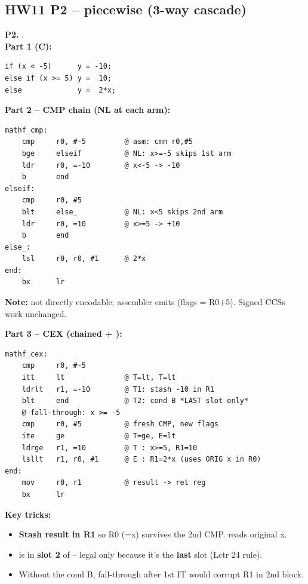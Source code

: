 \subsection{HW11 P2 --  piecewise (3-way cascade)}
\begin{hwp}\textbf{P2.} .\\
\textbf{Part 1 (C):}
\begin{lstlisting}[language={}]
if (x < -5)      y = -10;
else if (x >= 5) y =  10;
else             y =  2*x;
\end{lstlisting}

\textbf{Part 2 -- CMP chain (NL at each arm):}
\begin{lstlisting}
mathf_cmp:
    cmp     r0, #-5         @ asm: cmn r0,#5
    bge     elseif          @ NL: x>=-5 skips 1st arm
    ldr     r0, =-10        @ x<-5 -> -10
    b       end
elseif:
    cmp     r0, #5
    blt     else_           @ NL: x<5 skips 2nd arm
    ldr     r0, =10         @ x>=5 -> +10
    b       end
else_:
    lsl     r0, r0, #1      @ 2*x
end:
    bx      lr
\end{lstlisting}
\textbf{Note:}  not directly encodable; assembler emits  (flags = R0+5). Signed CCSs work unchanged.

\textbf{Part 3 -- CEX (chained  + ):}
\begin{lstlisting}
mathf_cex:
    cmp     r0, #-5
    itt     lt              @ T=lt, T=lt
    ldrlt   r1, =-10        @ T1: stash -10 in R1
    blt     end             @ T2: cond B *LAST slot only*
    @ fall-through: x >= -5
    cmp     r0, #5          @ fresh CMP, new flags
    ite     ge              @ T=ge, E=lt
    ldrge   r1, =10         @ T : x>=5, R1=10
    lsllt   r1, r0, #1      @ E : R1=2*x (uses ORIG x in R0)
end:
    mov     r0, r1          @ result -> ret reg
    bx      lr
\end{lstlisting}
\textbf{Key tricks:}
\begin{itemize}
\item \textbf{Stash result in R1} so R0 (=x) survives the 2nd CMP.  reads original x.
\item {} is in \textbf{slot 2} of  -- legal only because it's the \textbf{last} slot (Lctr 24 rule).
\item Without the cond B, fall-through after 1st IT would corrupt R1 in 2nd block.
\end{itemize}
\end{hwp}

